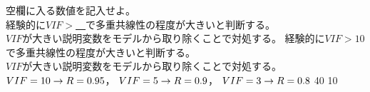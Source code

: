 \begin{quiz}{\MyClass}
\QuizShortAnswer
{
  空欄に入る数値を記入せよ。\\
  経験的に$VIF>$\underline{　}で多重共線性の程度が大きいと判断する。\\
  $VIF$が大きい説明変数をモデルから取り除くことで対処する。
}
{
  経験的に$VIF>10$で多重共線性の程度が大きいと判断する。\\
  $VIF$が大きい説明変数をモデルから取り除くことで対処する。
  \footnotesize
  $VIF = 10 \rightarrow R = 0.95$，
  $VIF =  5 \rightarrow R = 0.9$，
  $VIF =  3 \rightarrow R = 0.8$
}
{40}
{10}
{}
{}
{}

\end{quiz}


